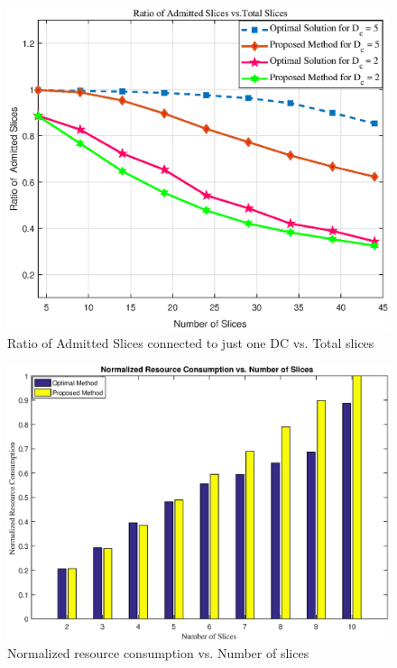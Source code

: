 \documentclass[conference]{IEEEtran}
\begin{document}
\begin{figure}[H]
  \centering
    \includegraphics[width=\linewidth]{f1}
  \caption{Ratio of Admitted Slices connected to just one DC vs. Total slices}
  \label{fig:f1}
\end{figure} 

\begin{figure}[H]
  \centering
    \includegraphics[width=\linewidth]{f2}
  \caption{Normalized resource consumption vs. Number of slices}
  \label{fig:f2}
\end{figure} 


\end{document}
